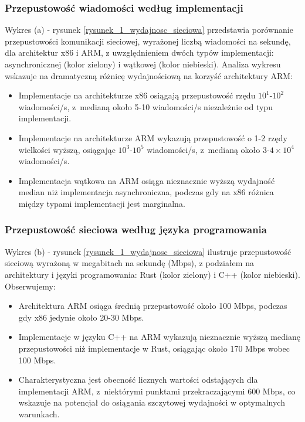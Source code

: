 \subsubsection{Przepustowość wiadomości według implementacji}
Wykres (a) - rysunek \ref{rysunek_1_wydajnosc_sieciowa} przedstawia porównanie przepustowości komunikacji sieciowej, wyrażonej liczbą wiadomości na sekundę, dla architektur x86 i ARM, z uwzględnieniem dwóch typów implementacji: asynchronicznej (kolor zielony) i wątkowej (kolor niebieski). Analiza wykresu wskazuje na dramatyczną różnicę wydajnościową na korzyść architektury ARM:
\begin{itemize}
    \item Implementacje na architekturze x86 osiągają przepustowość rzędu $10^1$-$10^2$ wiadomości/s, z~medianą około 5-10 wiadomości/s niezależnie od typu implementacji.
    \item Implementacje na architekturze ARM wykazują przepustowość o 1-2 rzędy wielkości wyższą, osiągając $10^3$-$10^5$ wiadomości/s, z~medianą około $3$-$4\times10^4$ wiadomości/s.
    \item Implementacja wątkowa na ARM osiąga nieznacznie wyższą wydajność median niż implementacja asynchroniczna, podczas gdy na x86 różnica między typami implementacji jest marginalna.
\end{itemize}

\subsubsection{Przepustowość sieciowa według języka programowania}
Wykres (b) - rysunek \ref{rysunek_1_wydajnosc_sieciowa} ilustruje przepustowość sieciową wyrażoną w megabitach na sekundę (Mbps), z podziałem na architektury i języki programowania: Rust (kolor zielony) i C++ (kolor niebieski). Obserwujemy:
\begin{itemize}
    \item Architektura ARM osiąga średnią przepustowość około 100 Mbps, podczas gdy x86 jedynie około 20-30 Mbps.
    \item Implementacje w języku C++ na ARM wykazują nieznacznie wyższą medianę przepustowości niż implementacje w Rust, osiągając około 170 Mbps wobec 100 Mbps.
    \item Charakterystyczna jest obecność licznych wartości odstających dla implementacji ARM, z~niektórymi punktami przekraczającymi 600 Mbps, co wskazuje na potencjał do osiągania szczytowej wydajności w optymalnych warunkach.
\end{itemize}


